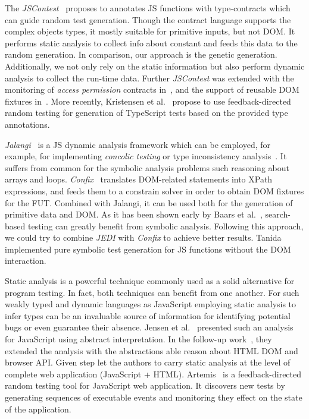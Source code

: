 \documentclass[sigconf,review]{acmart}
\begin{document}
The \emph{JSContest}~\cite{heidegger2010contract} proposes to annotates JS functions with type-contracts which can guide random test generation. Though the contract language supports the complex objects types, it mostly suitable for primitive inputs, but not DOM. It performs static analysis to collect info about constant and feeds this data to the random generation. In comparison, our approach is the genetic generation. Additionally, we not only rely on the static information but also perform dynamic analysis to collect the run-time data. Further \emph{JSContest} was extended with the monitoring of \emph{access permission} contracts in~\cite{heidegger2012jscontest}, and the support of reusable DOM fixtures in~\cite{heidegger2010dom}. More recently, Kristensen et al.~\cite{kristensen2017type} propose to use feedback-directed random testing for generation of TypeScript tests based on the provided type annotations. 

\emph{Jalangi}~\cite{sen2013jalangi} is a JS dynamic analysis framework which can be employed, for example, for implementing \emph{concolic testing} or {type inconsistency} analysis~\cite{pradel2015typedevil}. It suffers from common for the symbolic analysis problems such reasoning about arrays and loops. \emph{Confix}~\cite{amin:ase15} translates DOM-related statements into XPath expressions, and feeds them to a constrain solver in order to obtain DOM fixtures for the FUT. Combined with Jalangi, it can be used both for the generation of primitive data and DOM. As it has been shown early by Baars et al.~\cite{baars2011symbolic}, search-based testing can greatly benefit from symbolic analysis. Following this approach, we could try to combine \emph{JEDI} with \emph{Confix} to achieve better results. Tanida~\cite{tanida2014automatic} implemented pure symbolic test generation for JS functions without the DOM interaction.

Static analysis is a powerful technique commonly used as a solid alternative for program testing. In fact, both techniques can benefit from one another. For such weakly typed and dynamic languages as JavaScript employing static analysis to infer types can be an invaluable source of information for identifying potential bugs or even guarantee their absence. Jensen et al.~\cite{tajs2009} presented such an analysis for JavaScript using abstract interpretation. In the follow-up work~\cite{dom2011}, they extended the analysis with the abstractions able reason about HTML DOM and browser API. Given step let the authors to carry static analysis at the level of complete web application (JavaScript + HTML). Artemis~\cite{artemis2011} is a feedback-directed random testing tool for JavaScript web application. It discovers new tests by generating sequences of executable events and monitoring they effect on the state of the application.
\end{document}
